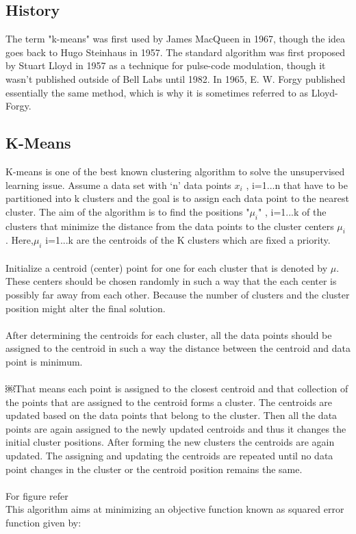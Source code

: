 \documentclass[11pt]{article}
\begin{document}
\subsection{History}
The term "k-means" was first used by James MacQueen in 1967, though the idea goes back to Hugo Steinhaus in 1957. The standard algorithm was first proposed by Stuart Lloyd in 1957 
as a technique for pulse-code modulation, though it wasn't published outside of Bell Labs until 1982. In 1965, E. W. Forgy published essentially the same method, which is why it is
sometimes referred to as Lloyd-Forgy. \cite{wiki_his}
\\

\subsection{K-Means} 
K-means is one of the best known clustering algorithm to solve the unsupervised learning issue. Assume a data set with ‘n’ data points $ x_i $ , i=1...n that have to be partitioned 
into k clusters and the goal is to assign each data point to the nearest cluster. The aim of the algorithm is to find the positions "$ \mu_i $" , i=1...k of the clusters that minimize the 
distance from the data points to the cluster centers $ \mu_i $ . Here,$ \mu_i $ i=1...k  are the centroids of the K clusters which are fixed a priority.\\
\\
Initialize a centroid (center) point for one for each cluster that is denoted by $ \mu $. These centers should be chosen randomly in such a way that the each center is possibly far away from each other. Because the number of clusters and the cluster position might alter the final solution.\\
\\
After determining the centroids for each cluster, all the data points should be assigned to the centroid in such a way the distance between the centroid and data point is minimum.\\
\\
￼That means each point is assigned to the closest centroid and that collection of the points that are assigned to the centroid forms a cluster. The centroids are updated based on the data points that belong to the cluster. Then all the data points are again assigned to the newly updated centroids and thus it changes the initial cluster positions. After forming the new clusters the centroids are again updated. The assigning and updating the centroids are repeated until no data point changes in the cluster or the centroid position remains the same.\\
\\
For figure refer \cite{fig_3}\\
This algorithm aims at minimizing an objective function known as squared error function given by:\\  
\end{document}
